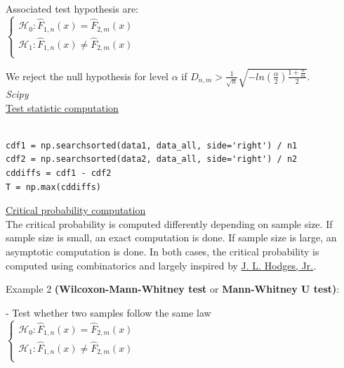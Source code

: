 Associated test hypothesis are: \\

$
\left\{
    \begin{array}{ll}
        \mathcal{H}_0: \widehat{F}_{1,n}(x) = \widehat{F}_{2,m}(x) \\
        \mathcal{H}_1: \widehat{F}_{1,n}(x) \neq \widehat{F}_{2,m}(x) \\
    \end{array}
\right.
$

We reject the null hypothesis for level $\alpha$ if $D_{n,m} > \frac{1}{\sqrt{n}} \sqrt{-ln(\frac{\alpha}{2}) \frac{1 + \frac{n}{m}}{2}}$. \\

\textit{Scipy} \\

\underline{Test statistic computation}

\lstset{language=Python}
\lstset{frame=lines}
\lstset{basicstyle=\footnotesize}
\begin{lstlisting}

cdf1 = np.searchsorted(data1, data_all, side='right') / n1
cdf2 = np.searchsorted(data2, data_all, side='right') / n2
cddiffs = cdf1 - cdf2
T = np.max(cddiffs)

\end{lstlisting}

\underline{Critical probability computation} \\

The critical probability is computed differently depending on sample size. If sample size is small, an exact computation is done. If sample size is large, an asymptotic computation is done.
In both cases, the critical probability is computed using combinatorics and largely inspired by \href{https://projecteuclid.org/download/pdf_1/euclid.afm/1485893310}{J. L. Hodges, Jr.}.

\vspace{5mm}

Example 2 \textbf{(Wilcoxon-Mann-Whitney test} or \textbf{Mann-Whitney U test)}: 

\vspace{5mm}

- Test whether two samples follow the same law \\

$
\left\{
    \begin{array}{ll}
        \mathcal{H}_0: \widehat{F}_{1,n}(x) = \widehat{F}_{2,m}(x) \\
        \mathcal{H}_1: \widehat{F}_{1,n}(x) \neq \widehat{F}_{2,m}(x) \\
    \end{array}
\right.
$

